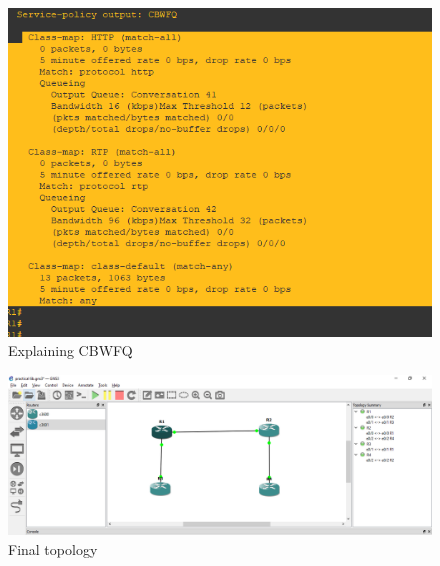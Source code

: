 \documentclass[paper=letter, fontsize=12pt]{article}
\begin{document}
\begin{figure}[H]
	\includegraphics[width=450px]{refs/ex-CBWFQ}
	\caption{Explaining CBWFQ}
\end{figure}


\begin{figure}[H]
	\includegraphics[width=450px]{refs/final_topology}
	\caption{Final topology}
\end{figure}
\end{document}

